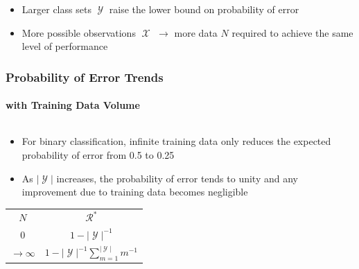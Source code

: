 \documentclass[aspectratio=169]{beamer}
\DeclareMathOperator{\Xcal}{\mathcal{X}}
\DeclareMathOperator{\Ycal}{\mathcal{Y}}
\DeclareMathOperator{\Rcal}{\mathcal{R}}
\begin{document}
\begin{frame}
\begin{columns}[c]
\begin{column}{.5\linewidth}
\end{column}

\end{columns}

\begin{itemize}
\item Larger class sets $\Ycal$ raise the lower bound on probability of error
\item More possible observations $\Xcal$ $\longrightarrow$ more data $N$ required to achieve the same level of performance
\end{itemize}

\end{frame}




\begin{frame}
\frametitle{Probability of Error Trends}
\framesubtitle{with Training Data Volume}

\begin{columns}[c]

\begin{column}{.5\linewidth}

\begin{itemize}
\item For binary classification, infinite training data only reduces the expected probability of error from 0.5 to 0.25
\item As $|\Ycal|$ increases, the probability of error tends to unity and any improvement due to training data becomes negligible
\end{itemize}

\begin{table}
\renewcommand{\arraystretch}{1.3}
\begin{tabular}{| c | c |}
\hline 
$N$ & $\Rcal^*$ \\
\hhline{|=|=|}
$0$ & $1 - |\Ycal|^{-1}$  \\ 
\hline
$\to \infty$ & $1 - |\Ycal|^{-1} \sum_{m=1}^{|\Ycal|} m^{-1}$ \\
\hline
\end{tabular}
\end{table}

\end{column}

\begin{column}{.5\linewidth}


\end{column}
\end{columns}
\end{frame}
\end{document}

